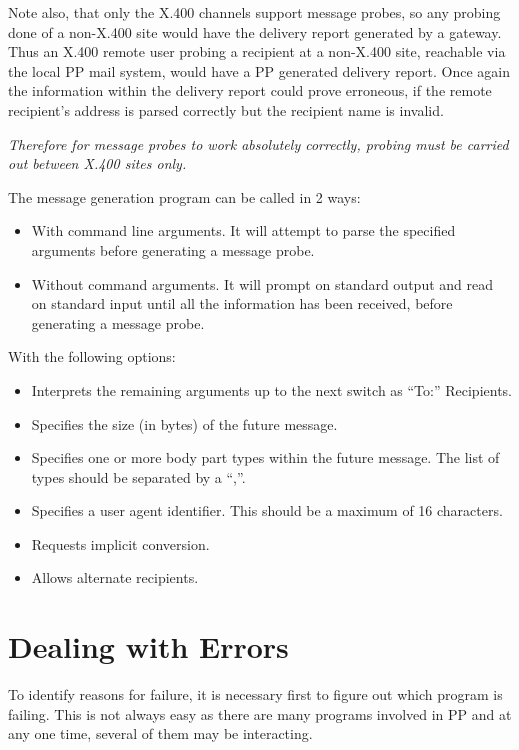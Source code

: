 Note also, that only the X.400 channels support message probes, 
so any probing done of a non-X.400 site would have the delivery report 
generated by a gateway. Thus an X.400 remote user probing a recipient at 
a non-X.400 site, reachable via the local PP mail system, would have 
a PP generated delivery report. Once again the information 
within the delivery report could prove erroneous, if the remote 
recipient's address is parsed correctly but the recipient name 
is invalid.

{\em Therefore for message probes to work absolutely correctly, 
probing must be carried out between X.400 sites only.}

The  message generation program can be called in 2 ways: 

\begin{itemize}
\item With command line arguments. It will attempt to 
parse the specified arguments before generating a message probe.

\item Without command arguments. It will prompt on 
standard output and read on standard input until all the information 
has been received, before generating a message probe.
\end{itemize}

With the following options: 

\begin{itemize}
\item[\verb|-t|:] Interprets the remaining arguments up to the next switch as
``To:'' Recipients.
\item[\verb|-s|:] Specifies the size (in bytes) of the future message.
\item[\verb|-e|:] Specifies one or more body part types within 
the future message. The list of types should be separated 
by a ``,''. 
\item[\verb|-u|:] Specifies a user agent identifier. This should be a 
maximum of 16 characters.
\item[\verb|-i|:] Requests implicit conversion.
\item[\verb|-a|:] Allows alternate recipients.
\end{itemize} 

\section {Dealing with Errors}

To identify reasons for failure, it is necessary first to figure out
which program is failing. This is not always easy as there are many
programs involved in PP and at any one time, several of them may be
interacting. 

